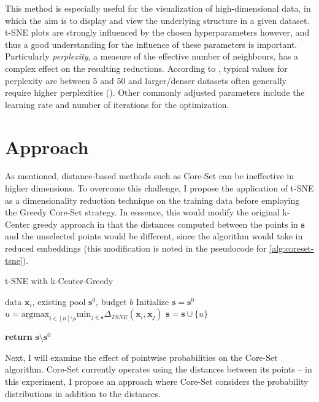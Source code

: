 \documentclass[english,bachelor,ul]{webisthesis} %
\begin{document}
This method is especially useful for the visualization of high-dimensional data, in which the aim is to display and view the underlying structure in a given dataset. t-SNE plots are strongly influenced by the chosen hyperparameters however, and thus a good understanding for the influence of these parameters is important. Particularly \textit{perplexity}, a measure of the effective number of neighbours, has a complex effect on the resulting reductions. According to \cite{van2008visualizing}, typical values for perplexity are between 5 and 50 and larger/denser datasets often generally require higher perplexities (\cite{vanHomepage}). Other commonly adjusted parameters include the learning rate and number of iterations for the optimization.

\chapter{Approach}

As mentioned, distance-based methods such as Core-Set can be ineffective in higher dimensions. To overcome this challenge, I propose the application of t-SNE as a dimensionality reduction technique on the training data before employing the Greedy Core-Set strategy. In esssence, this would modify the original k-Center greedy approach in that the distances computed between the points in $ \mathbf{s} $ and the unselected points would be different, since the algorithm would take in reduced embeddings (this modification is noted in the pseudocode for \ref{alg:coreset-tsne}).

\begin{algorithm}
\caption{t-SNE with k-Center-Greedy}%
\makeatletter{}\makeatother
\label{alg:coreset-tsne}
\begin{algorithmic}


\Require data $ \mathbf{x}_i $, existing pool $ \mathbf{s}^0 $, budget $ b $
\State Initialize $ \mathbf{s} = \mathbf{s}^0 $
\Repeat
\State $ u = \text{argmax}_{i \in [n] \setminus \mathbf{s}} \text{min}_{j \in \mathbf{s}} \Delta_{TSNE}(\mathbf{x}_i, \mathbf{x}_j) $
\State $ \mathbf{s} = \mathbf{s} \cup \{u\} $

\State \textbf{return} $\mathbf{s} \setminus \mathbf{s}^0 $
\end{algorithmic}
\end{algorithm}

Next, I will examine the effect of pointwise probabilities on the Core-Set algorithm. Core-Set currently operates using the distances between its points -- in this experiment, I propose an approach where Core-Set considers the probability distributions in addition to the distances. 
\end{document}
